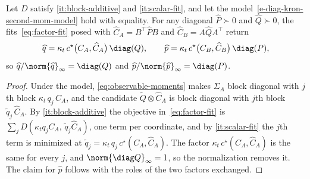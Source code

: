 \begin{lemma}[Consistency]\label{lem:consistency}
Let $D$ satisfy \ref{it:block-additive} and \ref{it:scalar-fit}, and let the
model~\eqref{e-diag-kron-second-mom-model} hold with equality. For any
diagonal $\widehat P\succ0$ and $\widehat Q\succ0$, the
fits~\eqref{eq:factor-fit} posed with $\widehat C_A=B^\top\widehat PB$
and $\widehat C_B=A\widehat QA^\top$ return
\[
  \widehat q=\kappa_t\,c^\star\big(C_A,\widehat C_A\big)\,\diag(Q),
  \qquad
  \widehat p=\kappa_t\,c^\star\big(C_B,\widehat C_B\big)\,\diag(P),
\]
so $\widehat q/\norm{\widehat q}_\infty=\diag(Q)$ and
$\widehat p/\norm{\widehat p}_\infty=\diag(P)$.
\end{lemma}
\begin{proof}
Under the model, \eqref{eq:observable-moments} makes $\Sigma_A$ block
diagonal with $j$th block $\kappa_t\,q_j\,C_A$, and the candidate
$\tilde Q\otimes\widehat C_A$ is block diagonal with $j$th block
$\tilde q_j\,\widehat C_A$. By \ref{it:block-additive} the objective
in~\eqref{eq:factor-fit} is
$\sum_jD(\kappa_t q_jC_A,\,\tilde q_j\widehat C_A)$, one term per
coordinate, and by \ref{it:scalar-fit} the $j$th term is minimized at
$\tilde q_j=\kappa_t\,q_j\,c^\star(C_A,\widehat C_A)$. The factor
$\kappa_t\,c^\star(C_A,\widehat C_A)$ is the same for every $j$, and
$\norm{\diag Q}_\infty=1$, so the normalization removes it. The claim
for $\widehat p$ follows with the roles of the two factors exchanged.
\end{proof}

